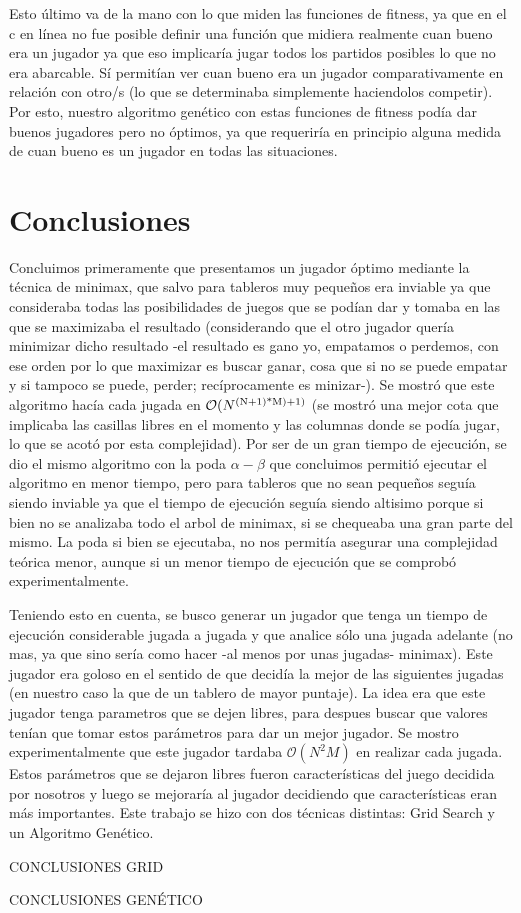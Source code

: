 \documentclass[A4paper,oneside,fleqn,11pt]{article}
\theoremstyle{definition}
\begin{document}
Esto último va de la mano con lo que miden las funciones de fitness, ya que en el c en línea no fue posible definir una función que midiera realmente cuan bueno era un jugador ya que eso implicaría jugar todos los partidos posibles lo que no era abarcable. Sí permitían ver cuan bueno era un jugador comparativamente en relación con otro/s (lo que se determinaba simplemente haciendolos competir). Por esto, nuestro algoritmo genético con estas funciones de fitness podía dar buenos jugadores pero no óptimos, ya que requeriría en principio alguna medida de cuan bueno es un jugador en todas las situaciones.

\section{Conclusiones}

Concluimos primeramente que presentamos un jugador óptimo mediante la técnica de minimax, que salvo para tableros muy pequeños era inviable ya que consideraba todas las posibilidades de juegos que se podían dar y tomaba en las que se maximizaba el resultado (considerando que el otro jugador quería minimizar dicho resultado -el resultado es gano yo, empatamos o perdemos, con ese orden por lo que maximizar es buscar ganar, cosa que si no se puede empatar y si tampoco se puede, perder; recíprocamente es minizar-). Se mostró que este algoritmo hacía cada jugada en $\mathcal{O}(N\textsuperscript{(N+1)*M)+1)}$ (se mostró una mejor cota que implicaba las casillas libres en el momento y las columnas donde se podía jugar, lo que se acotó por esta complejidad). Por ser de un gran tiempo de ejecución, se dio el mismo algoritmo con la poda $\alpha - \beta$ que concluimos permitió ejecutar el algoritmo en menor tiempo, pero para tableros que no sean pequeños seguía siendo inviable ya que el tiempo de ejecución seguía siendo altisimo porque si bien no se analizaba todo el arbol de minimax, si se chequeaba una gran parte del mismo. La poda si bien se ejecutaba, no nos permitía asegurar una complejidad teórica menor, aunque si un menor tiempo de ejecución que se comprobó experimentalmente.

Teniendo esto en cuenta, se busco generar un jugador que tenga un tiempo de ejecución considerable jugada a jugada y que analice sólo una jugada adelante (no mas, ya que sino sería como hacer -al menos por unas jugadas- minimax). Este jugador era goloso en el sentido de que decidía la mejor de las siguientes jugadas (en nuestro caso la que de un tablero de mayor puntaje). La idea era que este jugador tenga parametros que se dejen libres, para despues buscar que valores tenían que tomar estos parámetros para dar un mejor jugador. Se mostro experimentalmente que este jugador tardaba $\mathcal{O}(N^2M)$ en realizar cada jugada. Estos parámetros que se dejaron libres fueron características del juego decidida por nosotros y luego se mejoraría al jugador decidiendo que características eran más importantes. Este trabajo se hizo con dos técnicas distintas: Grid Search y un Algoritmo Genético.

CONCLUSIONES GRID

CONCLUSIONES GENÉTICO
\end{document}
